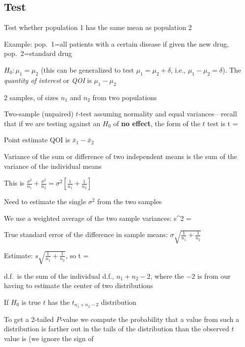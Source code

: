 \subsection{Test}
\bi
\item Test whether population 1 has the same mean as population 2
\item Example: pop.\ 1=all patients with a certain disease if given
  the new drug, pop.\ 2=standard drug
\item $H_{0}: \mu_{1}=\mu_{2}$ (this can be generalized to test
  $\mu_{1}=\mu_{2}+\delta$, i.e., $\mu_{1}-\mu_{2}=\delta$).  The
  \emph{quantity of interest} or \emph{QOI} is $\mu_{1}-\mu_{2}$
\item 2 samples, of sizes $n_{1}$ and $n_{2}$ from two populations
\item Two-sample (unpaired) $t$-test assuming normality and equal
variances---recall that if we are testing against an $H_0$ of
\textbf{no effect}, the form of the $t$ test is
\beq
t =
\eeq
\item Point estimate QOI is $\bar{x}_{1} - \bar{x}_{2}$
\item Variance of the sum or difference of two independent means is
  the sum of the variance of the individual means
\item This is $\frac{\sigma^{2}}{n_{1}} + \frac{\sigma^{2}}{n_{2}} =
  \sigma^{2}[\frac{1}{n_{1}} + \frac{1}{n_{2}}]$
\item Need to estimate the single $\sigma^{2}$ from the two samples
\item We use a weighted average of the two sample variances:
\beq
s^{2} = 
\eeq
\item True standard error of the difference in sample means: $\sigma
  \sqrt{\frac{1}{n_{1}} + \frac{1}{n_{2}}}$
\item Estimate: $s \sqrt{\frac{1}{n_{1}} + \frac{1}{n_{2}}}$, so
\beq
t = 
\eeq
\item d.f.\ is the sum of the individual d.f., $n_{1}+n_{2}-2$, where
  the $-2$ is from our having to estimate the center of two
  distributions
\item If $H_{0}$ is true $t$ has the $t_{n_{1}+n_{2}-2}$ distribution
\item To get a 2-tailed $P$-value we compute the probability that a
  value from such a distribution is farther out in the tails of the
  distribution than the observed $t$ value is (we ignore the sign of
